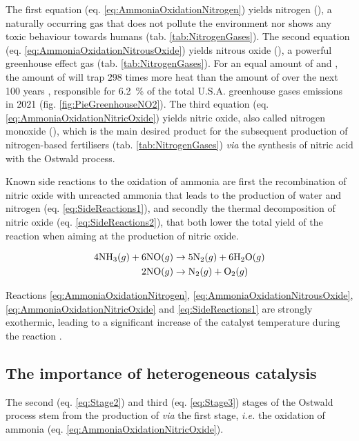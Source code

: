 The first equation (eq. \ref{eq:AmmoniaOxidationNitrogen}) yields nitrogen (\nitrogen), a naturally occurring gas that does not pollute the environment nor shows any toxic behaviour towards humans (tab. \ref{tab:NitrogenGases}).
The second equation (eq. \ref{eq:AmmoniaOxidationNitrousOxide}) yields nitrous oxide (\nitrousoxide), a powerful greenhouse effect gas (tab. \ref{tab:NitrogenGases}).
For an equal amount of \nitrousoxide and \carbondioxide, the amount of \nitrousoxide will trap 298 times more heat than the amount of \carbondioxide over the next 100 years \parencite{MITCLIMATE}, responsible for \qty{6.2}{\percent} of the total U.S.A. greenhouse gases emissions in 2021 (fig. \ref{fig:PieGreenhouseNO2}).
The third equation (eq. \ref{eq:AmmoniaOxidationNitricOxide}) yields nitric oxide, also called nitrogen monoxide (\nitricoxide), which is the main desired product for the subsequent production of nitrogen-based fertilisers (tab. \ref{tab:NitrogenGases}) \textit{via} the synthesis of nitric acid with the Ostwald process.

Known side reactions to the oxidation of ammonia are first the recombination of nitric oxide with unreacted ammonia that leads to the production of water and nitrogen (eq. \ref{eq:SideReactions1}), and secondly the thermal decomposition of nitric oxide (eq. \ref{eq:SideReactions2}), that both lower the total yield of the reaction when aiming at the production of nitric oxide.

\begin{align}
    \label{eq:SideReactions1}
    4 \ammonia (g) + 6 \nitricoxide (g) & \rightarrow 5 \nitrogen (g) + 6 \water (g)\\
    \label{eq:SideReactions2}
    2 \nitricoxide (g) & \rightarrow \nitrogen (g) + \dioxygen (g)
\end{align}

Reactions \ref{eq:AmmoniaOxidationNitrogen}, \ref{eq:AmmoniaOxidationNitrousOxide}, \ref{eq:AmmoniaOxidationNitricOxide} and \ref{eq:SideReactions1} are strongly exothermic, leading to a significant increase of the catalyst temperature during the reaction \parencite{Hatscher2008}.


\subsection{The importance of heterogeneous catalysis}\label{sec:AmoOxiHC}

The second (eq. \ref{eq:Stage2}) and third (eq. \ref{eq:Stage3}) stages of the Ostwald process stem from the production of \nitricoxide \textit{via} the first stage, \textit{i.e.} the oxidation of ammonia (eq. \ref{eq:AmmoniaOxidationNitricOxide}).

